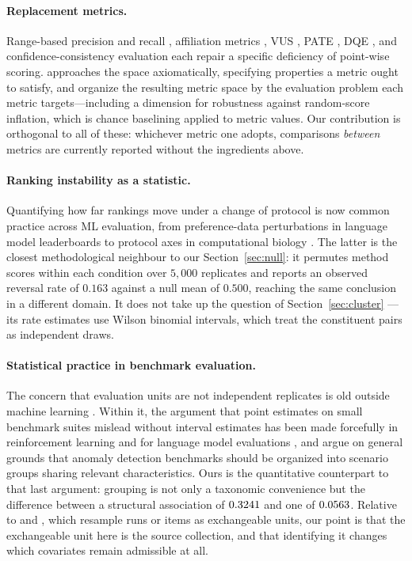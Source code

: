 \documentclass[twoside,11pt]{article}
\begin{document}
\paragraph{Replacement metrics.} Range-based precision and recall
\citep{tatbul2018precision}, affiliation metrics \citep{huet2022local}, VUS
\citep{paparrizos2022vus}, PATE \citep{ghorbani2024pate}, DQE
\citep{li2026dqe}, and confidence-consistency evaluation \citep{zhong2025cce}
each repair a specific deficiency of point-wise scoring.
\citet{wagner2025formally} approaches the space axiomatically, specifying
properties a metric ought to satisfy, and \citet{yang2025problem} organize the
resulting metric space by the evaluation problem each metric targets---including
a dimension for robustness against random-score inflation, which is chance
baselining applied to metric values. Our contribution is orthogonal to all of
these: whichever metric one adopts, comparisons \emph{between} metrics are
currently reported without the ingredients above.

\paragraph{Ranking instability as a statistic.} Quantifying how far rankings
move under a change of protocol is now common practice across ML evaluation,
from preference-data perturbations in language model leaderboards
\citep{dropping2025preferences} to protocol axes in computational biology
\citep{kendiukhov2026quantifying}. The latter is the closest methodological
neighbour to our Section~\ref{sec:null}: it permutes method scores within each
condition over $5{,}000$ replicates and reports an observed reversal rate of
$0.163$ against a null mean of $0.500$, reaching the same conclusion in a
different domain. It does not take up the question of Section~\ref{sec:cluster}
--- its rate estimates use Wilson binomial intervals, which treat the
constituent pairs as independent draws.

\paragraph{Statistical practice in benchmark evaluation.} The concern that
evaluation units are not independent replicates is old outside machine learning
\citep{hurlbert1984pseudoreplication}. Within it, the argument that point
estimates on small benchmark suites mislead without interval estimates has been
made forcefully in reinforcement learning \citep{agarwal2021precipice} and for
language model evaluations \citep{miller2024errorbars}, and
\citet{rochner2025rethink} argue on general grounds that anomaly detection
benchmarks should be organized into scenario groups sharing relevant
characteristics. Ours is the quantitative counterpart to that last argument:
grouping is not only a taxonomic convenience but the difference between a
structural association of $0.3241{}$ and one of $0.0563{}$. Relative
to \citet{agarwal2021precipice} and \citet{miller2024errorbars}, which resample
runs or items as exchangeable units, our point is that the exchangeable unit
here is the source collection, and that identifying it changes which covariates
remain admissible at all.
\end{document}
